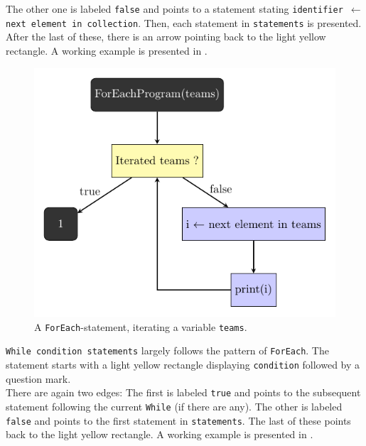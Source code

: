 The other one is labeled \texttt{false} and points to a statement stating \texttt{identifier $\gets$ next element in collection}. Then, each statement in \texttt{statements} is presented. After the last of these, there is an arrow pointing back to the light yellow rectangle. A working example is presented in . \\

\begin{figure}[ht]
    \centering
    \includegraphics[scale=.75]{assets/chapter4/ForEachProgram_ibp.pdf}
    \caption{A \texttt{ForEach}-statement, iterating a variable \texttt{teams}.}
    \label{flochartForEach}
\end{figure}

\newpage

\texttt{While condition statements} largely follows the pattern of \texttt{ForEach}. The statement starts with a light yellow rectangle displaying \texttt{condition} followed by a question mark. \\

There are again two edges: The first is labeled \texttt{true} and points to the subsequent statement following the current \texttt{While} (if there are any). The other is labeled \texttt{false} and points to the first statement in \texttt{statements}. The last of these points back to the light yellow rectangle. A working example is presented in . \\

